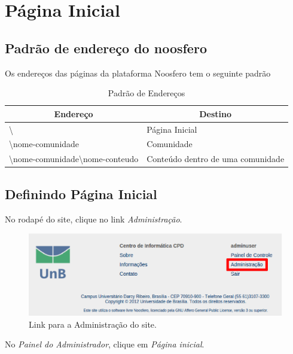 \chapter{Página Inicial}
\label{chap:paginaInicial}

\section{Padrão de endereço do noosfero}
\label{sec:padraoEndereco}

Os endereços das páginas da plataforma Noosfero tem o seguinte padrão

\begin{table}[h]
\begin{tabular}{|l|l|}
  \hline
  \multicolumn{1}{|c|}{\textbf{Endereço}} & \multicolumn{1}{c|}{\textbf{Destino}} \\
  \hline
  \textbackslash & Página Inicial \\
  \textbackslash nome-comunidade & Comunidade \\
  \textbackslash nome-comunidade\textbackslash nome-conteudo & Conteúdo dentro de uma comunidade \\
  \hline
\end{tabular}
\caption {Padrão de Endereços}
\end{table}

\section{Definindo Página Inicial}
\label{sec:paginaInicial}

No rodapé do site, clique no link \emph{\color{red}Administração}.

\begin{figure}[h]
     \centering
       \includegraphics[keepaspectratio=true,scale=0.3]{figuras/linkAdmin.eps}
     \caption{Link para a Administração do site.}
     \label{fig:linkAdmin}
\end{figure}

No \emph{Painel do Administrador}, clique em \emph{\color{red}Página inicial}.


